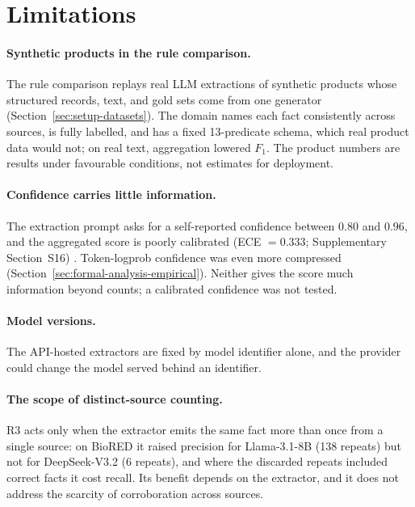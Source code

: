 \documentclass[preprint,12pt,authoryear]{elsarticle}
\begin{document}
\section{Limitations}
\label{sec:limitations}

\paragraph{Synthetic products in the rule comparison.} The rule
comparison replays real LLM extractions of synthetic products whose
structured records, text, and gold sets come from one generator
(Section~\ref{sec:setup-datasets}). The domain names each fact
consistently across sources, is fully labelled, and has a fixed
13-predicate schema, which real product data would not; on real text,
aggregation lowered $F_1$. The product numbers are results under
favourable conditions, not estimates for deployment.

\paragraph{Confidence carries little information.} The extraction prompt
asks for a self-reported confidence between $0.80$ and $0.96$, and the
aggregated score is poorly calibrated (ECE $=0.333$; Supplementary
Section~S16)
. Token-logprob confidence was even more compressed
(Section~\ref{sec:formal-analysis-empirical}). Neither gives the score
much information beyond counts; a calibrated confidence was not tested.

\paragraph{Model versions.} The API-hosted extractors are fixed by model
identifier alone, and the provider could change the model served behind
an identifier.

\paragraph{The scope of distinct-source counting.} R3 acts only when the
extractor emits the same fact more than once from a single source: on
BioRED it raised precision for Llama-3.1-8B (138 repeats) but not for
DeepSeek-V3.2 (6 repeats), and where the discarded repeats included
correct facts it cost recall. Its benefit depends on the extractor, and
it does not address the scarcity of corroboration across sources.
\end{document}
